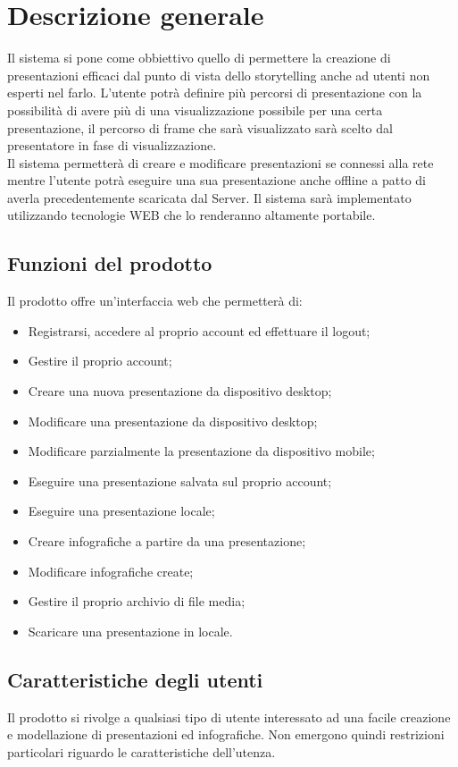 \section{Descrizione generale}{
Il sistema si pone come obbiettivo quello di permettere la creazione di presentazioni efficaci dal punto di vista dello storytelling anche ad utenti non esperti nel farlo.
L'utente potrà definire più percorsi di presentazione con la possibilità di avere più di una visualizzazione possibile per una certa presentazione, il percorso di frame che sarà visualizzato sarà scelto dal presentatore in fase di visualizzazione.\\
Il sistema permetterà di creare e modificare presentazioni se connessi alla rete mentre l'utente potrà eseguire una sua presentazione anche offline a patto di averla precedentemente scaricata dal Server.
Il sistema sarà implementato utilizzando tecnologie WEB che lo renderanno altamente portabile.

\subsection{Funzioni del prodotto}{
	Il prodotto offre un'interfaccia web che permetterà di:
	\begin{itemize}
		\item Registrarsi, accedere al proprio account ed effettuare il logout;
		\item Gestire il proprio account;
		\item Creare una nuova presentazione da dispositivo desktop;
		\item Modificare una presentazione da dispositivo desktop;
		\item Modificare parzialmente la presentazione da dispositivo mobile;
		\item Eseguire una presentazione salvata sul proprio account;
		\item Eseguire una presentazione locale;
		\item Creare infografiche a partire da una presentazione;
		\item Modificare infografiche create;
		\item Gestire il proprio archivio di file media;
		\item Scaricare una presentazione in locale.
	\end{itemize}
}
\subsection{Caratteristiche degli utenti}{
	Il prodotto si rivolge a qualsiasi tipo di utente interessato ad una facile creazione e modellazione di presentazioni ed infografiche. Non emergono quindi restrizioni particolari riguardo le caratteristiche dell'utenza.
}
}
